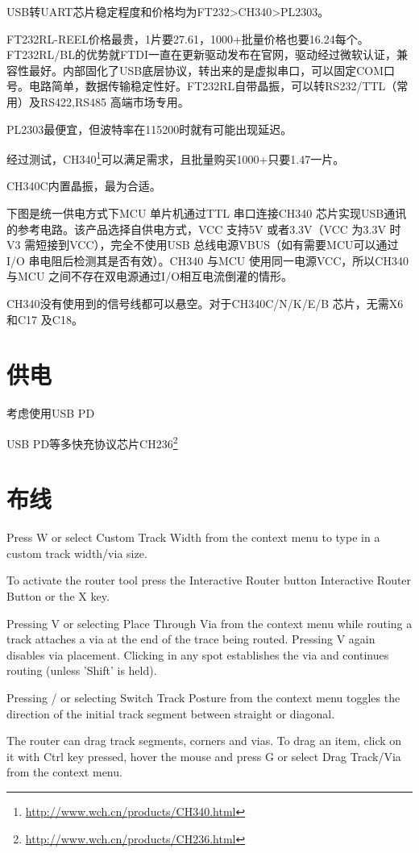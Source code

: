 USB转UART芯片稳定程度和价格均为FT232>CH340>PL2303。

FT232RL-REEL价格最贵，1片要27.61，1000+批量价格也要16.24每个。FT232RL/BL的优势就FTDI一直在更新驱动发布在官网，驱动经过微软认证，兼容性最好。内部固化了USB底层协议，转出来的是虚拟串口，可以固定COM口号。电路简单，数据传输稳定性好。FT232RL自带晶振，可以转RS232/TTL（常用）及RS422,RS485 高端市场专用。

PL2303最便宜，但波特率在115200时就有可能出现延迟。

经过测试，CH340\footnote{\url{http://www.wch.cn/products/CH340.html}}可以满足需求，且批量购买1000+只要1.47一片。

CH340C内置晶振，最为合适。

下图是统一供电方式下MCU 单片机通过TTL 串口连接CH340 芯片实现USB通讯的参考电路。该产品选择自供电方式，VCC 支持5V 或者3.3V（VCC 为3.3V 时V3 需短接到VCC），完全不使用USB 总线电源VBUS（如有需要MCU可以通过I/O 串电阻后检测其是否有效）。CH340 与MCU 使用同一电源VCC，所以CH340与MCU 之间不存在双电源通过I/O相互电流倒灌的情形。

CH340没有使用到的信号线都可以悬空。对于CH340C/N/K/E/B 芯片，无需X6 和C17 及C18。

\section{供电}

考虑使用USB PD

USB PD等多快充协议芯片CH236\footnote{\url{http://www.wch.cn/products/CH236.html}}








\section{布线}

Press W or select Custom Track Width from the context menu to type in a custom track width/via size.

To activate the router tool press the Interactive Router button Interactive Router Button or the X key. 

Pressing V or selecting Place Through Via from the context menu while routing a track attaches a via at the end of the trace being routed. Pressing V again disables via placement. Clicking in any spot establishes the via and continues routing (unless 'Shift' is held).

Pressing / or selecting Switch Track Posture from the context menu toggles the direction of the initial track segment between straight or diagonal.

The router can drag track segments, corners and vias. To drag an item, click on it with Ctrl key pressed, hover the mouse and press G or select Drag Track/Via from the context menu.